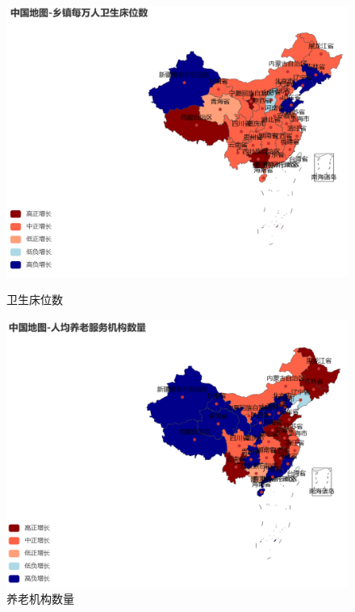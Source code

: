 \begin{figure}[H]
    \centering
    \begin{minipage}{0.45\textwidth}
        \centering
        \includegraphics[width=\linewidth]{figures/18.png}
        \caption{卫生床位数}
        \label{fig:beds}
    \end{minipage}\hfill
    \begin{minipage}{0.45\textwidth}
        \centering
        \includegraphics[width=\linewidth]{figures/17.png}
        \caption{养老机构数量}
        \label{fig:elderly-facilities}
    \end{minipage}
\end{figure}


